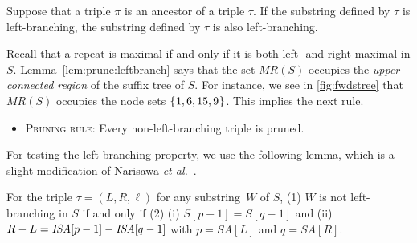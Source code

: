 \begin{lemma}\label{lem:prune:leftbranch}
Suppose that a triple $\pi$ is an ancestor of a triple $\tau$. If the substring defined by $\tau$ is left-branching, the substring defined by $\tau$ is also left-branching. 
\end{lemma}

Recall that a repeat is maximal if and only if it is both left- and right-maximal in $S$. Lemma~\cref{lem:prune:leftbranch} says that the set $MR(S)$ occupies the \textit{upper connected region} of the suffix tree of $S$. For instance, we see in \cref{fig:fwdstree} that $MR(S)$ occupies the node sets $\{\kern0.05em1,6,15,9\kern0.05em\}$. 
This implies the next rule.

\begin{itemize}\item[]
\quad\textsc{Pruning rule}: {Every non-left-branching triple is pruned.}
\end{itemize}

For testing the left-branching property, we use the following lemma, which is a slight modification of Narisawa \textit{et al.}~\cite[Lemma~10]{narisawa2007efficient}. 


\begin{lemma}\label{lem:leftmaximal:character}
For the triple $\tau = (L,R, \ell)$ for any substring~$W$ of $S$, 
(1) $W$ is not left-branching in $S$ if and only if  
(2) (i) $S[p-1] = S[q-1]$ and (ii) $R - L = \mathit{ISA}[p-1] - \mathit{ISA}[q-1]$ with $p = SA[L]$ and $q = SA[R]$.
\end{lemma}

